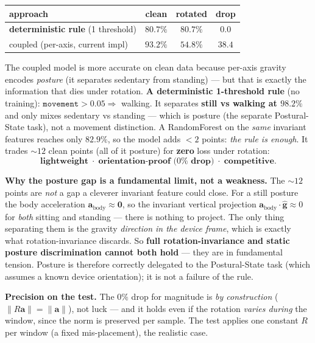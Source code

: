 \documentclass[11pt]{article}
\begin{document}
\begin{center}
\begin{tabular}{lccc}
approach & clean & rotated & drop\\ \hline
\textbf{deterministic rule} (1 threshold) & $80.7\%$ & $80.7\%$ & $\mathbf{0.0}$\\
coupled (per-axis, current impl)                 & $93.2\%$ & $54.8\%$ & $38.4$\\
\end{tabular}
\end{center}

The coupled model is more accurate on clean data because per-axis gravity encodes
\emph{posture} (it separates sedentary from standing) --- but that is exactly the
information that dies under rotation. \textbf{A deterministic 1-threshold
rule} (no training): $\texttt{movement}>0.05\Rightarrow$ walking. It separates
\textbf{still vs walking at $98.2\%$} and only mixes sedentary vs standing --- which is
posture (the separate Postural-State task), not a movement distinction. A RandomForest
on the \emph{same} invariant features reaches only $82.9\%$, so the model adds
$<\!2$ points: \emph{the rule is enough}. It trades $\sim\!12$ clean points (all of it
posture) for \textbf{zero} loss under rotation:
\[
\textbf{lightweight}\;\cdot\;\textbf{orientation-proof ($0\%$ drop)}\;\cdot\;\textbf{competitive.}
\]

\textbf{Why the posture gap is a fundamental limit, not a weakness.} The $\sim\!12$
points are \emph{not} a gap a cleverer invariant feature could close. For a still
posture the body acceleration $\mathbf a_{\text{body}}\!\approx\!\mathbf 0$, so the
invariant vertical projection $\mathbf a_{\text{body}}\!\cdot\!\hat{\mathbf g}\approx 0$
for \emph{both} sitting and standing --- there is nothing to project. The only thing
separating them is the gravity \emph{direction in the device frame}, which is exactly
what rotation-invariance discards. So \textbf{full rotation-invariance and static
posture discrimination cannot both hold} --- they are in fundamental tension. Posture
is therefore correctly delegated to the Postural-State task (which assumes a known
device orientation); it is not a failure of the rule.

\textbf{Precision on the test.} The $0\%$ drop for magnitude is \emph{by construction}
($\lVert R\mathbf a\rVert=\lVert\mathbf a\rVert$), not luck --- and it holds even if the
rotation \emph{varies during} the window, since the norm is preserved per sample. The
test applies one constant $R$ per window (a fixed mis-placement), the realistic case.
\end{document}
